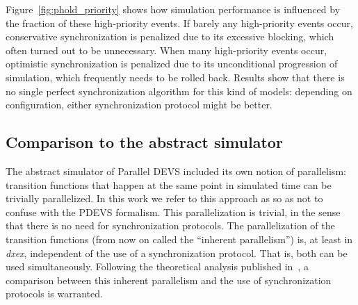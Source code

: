 Figure~\ref{fig:phold_priority} shows how simulation performance is influenced by the fraction of these high-priority events.
If barely any high-priority events occur, conservative synchronization is penalized due to its excessive blocking, which often turned out to be unnecessary.
When many high-priority events occur, optimistic synchronization is penalized due to its unconditional progression of simulation, which frequently needs to be rolled back.
Results show that there is no single perfect synchronization algorithm for this kind of models: depending on configuration, either synchronization protocol might be better.

\subsection{Comparison to the abstract simulator}
The abstract simulator of \textsf{Parallel DEVS} included its own notion of parallelism: transition functions that happen at the same point in simulated time can be trivially parallelized. In this work we refer to this approach as \pSim so as not to confuse with the PDEVS formalism.
This parallelization is trivial, in the sense that there is no need for synchronization protocols.
The parallelization of the transition functions (from now on called the ``inherent parallelism'') is, at least in \textit{dxex}, independent of the use of a synchronization protocol.
That is, both can be used simultaneously.
Following the theoretical analysis published in~\cite{amdahlpdevs}, a comparison between this inherent parallelism and the use of synchronization protocols is warranted.


